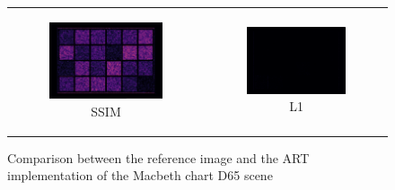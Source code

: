 \begin{figure}[h]
\begin{tabular}{cc}
\begin{subfigure}
			{0.4\textwidth}\centering\includegraphics[width=\linewidth]{img/macbeth_chart_D65_SSIM.png}
			\caption{SSIM}
		\end{subfigure} 
		&
		\begin{subfigure}
			{0.4\textwidth}\centering\includegraphics[width=\linewidth]{img/macbeth_chart_D65_L1.png}
			\caption{L1}
		\end{subfigure}
	\end{tabular}
	\caption{Comparison between the reference image and the ART implementation of the Macbeth chart D65 scene}
	\label{fig:compare_macbeth_d65}
\end{figure}

